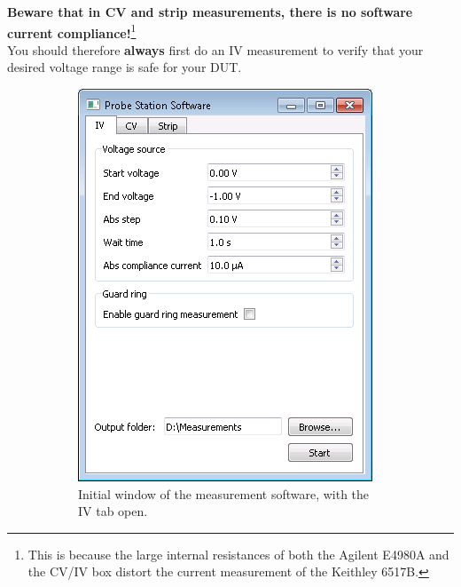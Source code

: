 \documentclass[a4paper]{article}
\begin{document}
{\bf Beware that in CV and strip measurements, there is no software current compliance!}\footnote{This is because the large internal resistances of both the Agilent E4980A and the CV/IV box distort the current measurement of the Keithley 6517B.}\\

You should therefore {\bf always} first do an IV measurement to verify that your desired voltage range is safe for your DUT.\\

\begin{figure}[hbtp]
\centering
\begin{subfigure}[t]{0.475\textwidth}
\centering\captionsetup{width=.8\linewidth}%
\includegraphics[width=\linewidth]{pictures/softiv.png}
\caption[Software with the IV Tab]{Initial window of the measurement software, with the IV tab open.}
\label{fig:softwareopeniv}
\end{subfigure}
\begin{subfigure}[t]{0.475\textwidth}

\end{subfigure}
\end{figure}
\end{document}
